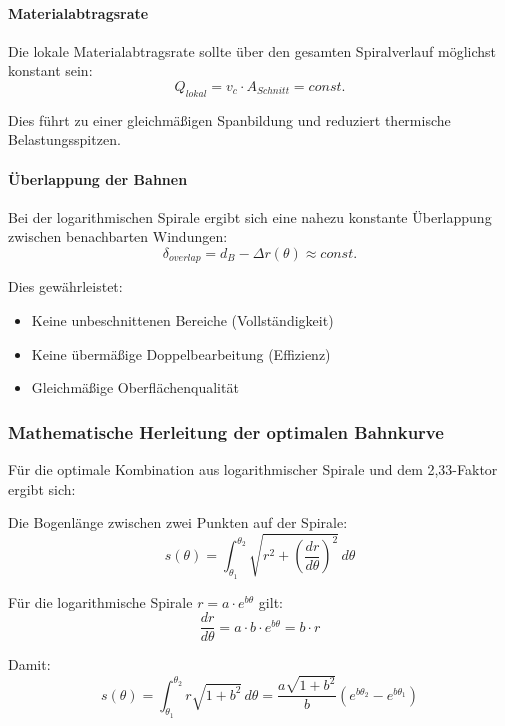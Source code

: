 ﻿\documentclass[12pt,a4paper]{article}
\begin{document}
\paragraph{Materialabtragsrate} Die lokale Materialabtragsrate sollte über den gesamten Spiralverlauf möglichst konstant sein:
\begin{equation}
	Q_{lokal} = v_c \cdot A_{Schnitt} = const.
\end{equation}

Dies führt zu einer gleichmäßigen Spanbildung und reduziert thermische Belastungsspitzen.

\paragraph{Überlappung der Bahnen} Bei der logarithmischen Spirale ergibt sich eine nahezu konstante Überlappung zwischen benachbarten Windungen:
\begin{equation}
	\delta_{overlap} = d_B - \Delta r(\theta) \approx const.
\end{equation}

Dies gewährleistet:
\begin{itemize}
	\item Keine unbeschnittenen Bereiche (Vollständigkeit)
	\item Keine übermäßige Doppelbearbeitung (Effizienz)
	\item Gleichmäßige Oberflächenqualität
\end{itemize}

\subsubsection{Mathematische Herleitung der optimalen Bahnkurve}

Für die optimale Kombination aus logarithmischer Spirale und dem 2,33-Faktor ergibt sich:

Die Bogenlänge zwischen zwei Punkten auf der Spirale:
\begin{equation}
	s(\theta) = \int_{\theta_1}^{\theta_2} \sqrt{r^2 + \left(\frac{dr}{d\theta}\right)^2} \, d\theta
\end{equation}

Für die logarithmische Spirale $r = a \cdot e^{b\theta}$ gilt:
\begin{equation}
	\frac{dr}{d\theta} = a \cdot b \cdot e^{b\theta} = b \cdot r
\end{equation}

Damit:
\begin{equation}
	s(\theta) = \int_{\theta_1}^{\theta_2} r\sqrt{1 + b^2} \, d\theta = \frac{a\sqrt{1+b^2}}{b}\left(e^{b\theta_2} - e^{b\theta_1}\right)
\end{equation}
\end{document}
